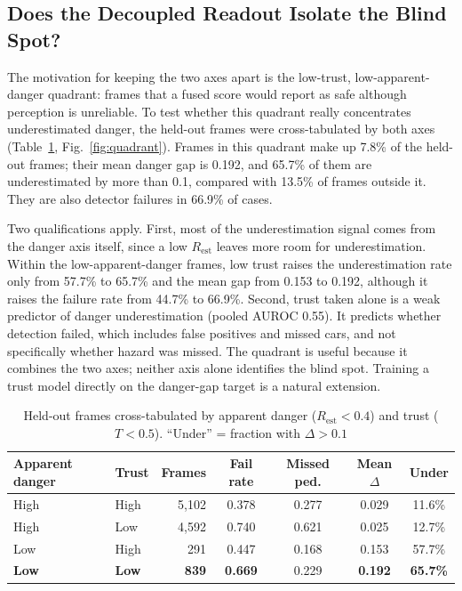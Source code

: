 \documentclass[pdflatex,sn-mathphys-num]{sn-jnl}
\newcommand{\Rest}{R_{\mathrm{est}}}
\begin{document}
\subsection{Does the Decoupled Readout Isolate the Blind Spot?}

The motivation for keeping the two axes apart is the low-trust, low-apparent-danger quadrant: frames that a fused score would report as safe although perception is unreliable. To test whether this quadrant really concentrates underestimated danger, the held-out frames were cross-tabulated by both axes (Table~\ref{tab:quadrant}, Fig.~\ref{fig:quadrant}). Frames in this quadrant make up 7.8\% of the held-out frames; their mean danger gap is 0.192, and 65.7\% of them are underestimated by more than 0.1, compared with 13.5\% of frames outside it. They are also detector failures in 66.9\% of cases.

Two qualifications apply. First, most of the underestimation signal comes from the danger axis itself, since a low $\Rest$ leaves more room for underestimation. Within the low-apparent-danger frames, low trust raises the underestimation rate only from 57.7\% to 65.7\% and the mean gap from 0.153 to 0.192, although it raises the failure rate from 44.7\% to 66.9\%. Second, trust taken alone is a weak predictor of danger underestimation (pooled AUROC 0.55). It predicts whether detection failed, which includes false positives and missed cars, and not specifically whether hazard was missed. The quadrant is useful because it combines the two axes; neither axis alone identifies the blind spot. Training a trust model directly on the danger-gap target is a natural extension.

\begin{table}[t]
\caption{Held-out frames cross-tabulated by apparent danger ($\Rest < 0.4$) and trust ($T < 0.5$). ``Under'' = fraction with $\Delta > 0.1$}
\label{tab:quadrant}
\begin{tabular}{@{}llrcccc@{}}
\toprule
Apparent danger & Trust & Frames & Fail rate & Missed ped. & Mean $\Delta$ & Under \\
\midrule
High & High & 5,102 & 0.378 & 0.277 & 0.029 & 11.6\% \\
High & Low & 4,592 & 0.740 & 0.621 & 0.025 & 12.7\% \\
Low & High & 291 & 0.447 & 0.168 & 0.153 & 57.7\% \\
\textbf{Low} & \textbf{Low} & \textbf{839} & \textbf{0.669} & 0.229 & \textbf{0.192} & \textbf{65.7\%} \\
\bottomrule
\end{tabular}
\end{table}
\end{document}
